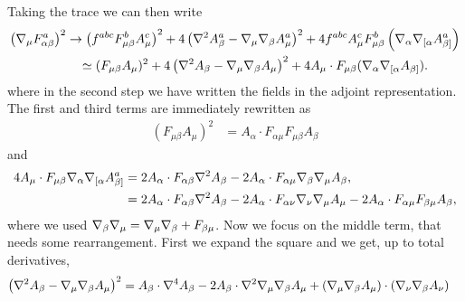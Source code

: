 Taking the trace we can then write
\begin{align}\label{LW1-expansion-intermediate}
\begin{split}
\left(\covD_\mu F^a_{\alpha\beta} \right)^2  
& \rightarrow 
 	\left(
 		f^{abc}  F^b_{\mu \beta} A_\mu^c
 	\right)^2
 	+ 4
 	\left(
 		\covD^2 A^a_{ \beta  } - \covD_\mu \covD_{ \beta  } A^a_{ \mu  } 
 	\right)^2 
	+ 4 f^{abc} A^c_\mu F^b_{ \mu \beta} \left( \covD_\alpha
 		 \covD_{ [ \alpha } A^a_{ \beta ] }
 	\right)\\
& \quad
\simeq
%
(F_{\mu\beta} A_\mu)^2
+ 4 \left( \covD^2 A_{ \beta  } - \covD_\mu \covD_{ \beta  } A_{ \mu  } \right)^2
+ 4 A_\mu \cdot F_{\mu\beta} ( \covD_\alpha \covD_{[\alpha} A_{\beta]} )
.
\end{split}
\end{align}
where in the second step we have written the fields in the adjoint representation.
The first and third terms are immediately rewritten as
\begin{align*}
\left(
	F_{\mu \beta} A_\mu
\right)^2
& =
	A_\alpha \cdot F_{\alpha \mu } F_{\mu \beta } A_\beta
\end{align*}
and
\begin{align*}
4  A_\mu \cdot F_{ \mu \beta} \covD_\alpha
 	 \covD_{ [ \alpha } A^a_{ \beta ] }
& = 
	2 A_\alpha \cdot F_{ \alpha \beta} \covD^2 A_{ \beta }
 	-
 	2 A_\alpha \cdot F_{ \alpha \mu } \covD_{ \beta } \covD_{ \mu } A_{ \beta },
 	\\
%
& = 
	2 A_\alpha \cdot F_{ \alpha \beta} \covD^2 A_{ \beta }
 	-
 	2 A_\alpha \cdot F_{ \alpha \nu } \covD_{ \nu } \covD_{ \mu  } A_{ \mu }	
 	-
 	2 A_\alpha \cdot F_{ \alpha \mu } F_{ \beta  \mu } A_{ \beta }	,
\end{align*}
where we used \({ \mathcal{\nabla} }_\beta { \mathcal{\nabla} }_\mu = { \mathcal{\nabla} }_\mu { \mathcal{\nabla} }_\beta + F_{\beta\mu}\).
Now we focus on the middle term, that needs some rearrangement. First we expand the square and we get, up to total derivatives,
\begin{align*}
\begin{split}
\left(	{ \mathcal{\nabla} }^2 A_{ \beta  } - { \mathcal{\nabla} }_\mu { \mathcal{\nabla} }_{ \beta  } A_{ \mu  } 	\right)^2 
& =
	A_\beta \cdot { \mathcal{\nabla} }^4 A_\beta
	- 2 A_\beta \cdot { \mathcal{\nabla} }^2 { \mathcal{\nabla} }_\mu { \mathcal{\nabla} }_\beta A_\mu
	+ ({ \mathcal{\nabla} }_\mu { \mathcal{\nabla} }_\beta A_\mu)\cdot ({ \mathcal{\nabla} }_\nu { \mathcal{\nabla} }_\beta A_\nu)
\end{split}
\end{align*}
